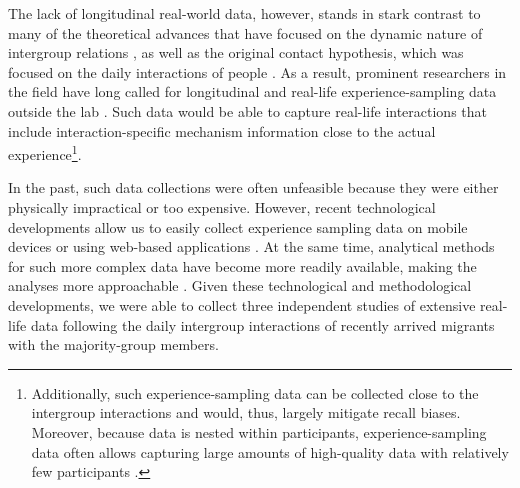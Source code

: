 \documentclass[man, 12pt, a4paper, mask]{apa7}
\theoremstyle{break}
\theoremstyle{plain}
\begin{document}
The lack of longitudinal real-world data, however, stands in stark contrast to many of the theoretical advances that have focused on the dynamic nature of intergroup relations \citep[e.g.,][]{Pettigrew1998}, as well as the original contact hypothesis, which was focused on the daily interactions of people \citep[][]{Allport1954b}. As a result, prominent researchers in the field have long called for longitudinal \citep[][]{Pettigrew1998, Pettigrew2008, Pettigrew2011} and real-life experience-sampling data outside the lab \citep[][]{MacInnis2015, McKeown2017}. Such data would be able to capture real-life interactions that include interaction-specific mechanism information close to the actual experience\footnote{Additionally, such experience-sampling data can be collected close to the intergroup interactions and would, thus, largely mitigate recall biases. Moreover, because data is nested within participants, experience-sampling data often allows capturing large amounts of high-quality data with relatively few participants \citep[][]{shiffman2008}.}.

In the past, such data collections were often unfeasible because they were either physically impractical or too expensive. However, recent technological developments allow us to easily collect experience sampling data on mobile devices \citep[e.g.,][]{Keil2020} or using web-based applications \citep[e.g.,][]{Arslan2020}. At the same time, analytical methods for such more complex data have become more readily available, making the analyses more approachable \citep[e.g., see][]{ODonnell2021}. Given these technological and methodological developments, we were able to collect three independent studies of extensive real-life data following the daily intergroup interactions of recently arrived migrants with the majority-group members.  
\end{document}

